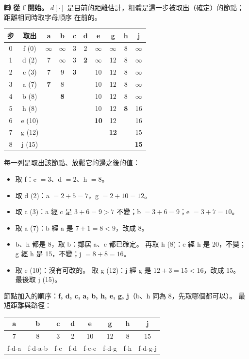 \begin{pastsoln}
\textbf{㈣ 從 f 開始。} $d[\cdot]$ 是目前的距離估計，粗體是這一步被取出（確定）的節點；距離相同時取字母順序
在前的。
\begin{center}
\small
\begin{tabular}{cc*{8}{c}}
\toprule
步 & 取出 & a & b & c & d & e & g & h & j \\
\midrule
0 & f (0) & $\infty$ & $\infty$ & 3 & 2 & $\infty$ & $\infty$ & 8 & $\infty$ \\
1 & d (2) & 7 & $\infty$ & 3 & \textbf{2} & $\infty$ & 12 & 8 & $\infty$ \\
2 & c (3) & 7 & 9 & \textbf{3} & & 10 & 12 & 8 & $\infty$ \\
3 & a (7) & \textbf{7} & 8 & & & 10 & 12 & 8 & $\infty$ \\
4 & b (8) & & \textbf{8} & & & 10 & 12 & 8 & $\infty$ \\
5 & h (8) & & & & & 10 & 12 & \textbf{8} & 16 \\
6 & e (10) & & & & & \textbf{10} & 12 & & 16 \\
7 & g (12) & & & & & & \textbf{12} & & 15 \\
8 & j (15) & & & & & & & & \textbf{15} \\
\bottomrule
\end{tabular}
\end{center}
每一列是取出該節點、放鬆它的邊之後的值：
\begin{itemize}
\item 取 f：c $= 3$、d $= 2$、h $= 8$。
\item 取 d (2)：a $= 2+5 = 7$，g $= 2+10 = 12$。
\item 取 c (3)：a 經 c 是 $3+6 = 9 > 7$ 不變；b $= 3+6 = 9$；e $= 3+7 = 10$。
\item 取 a (7)：b 經 a 是 $7+1 = 8 < 9$，改成 8。
\item b、h 都是 8，取 b：鄰居 a、c 都已確定。 再取 h (8)：e 經 h 是 20，不變；g 經 h 是 15，不變；j $= 8+8 = 16$。
\item 取 e (10)：沒有可改的。 取 g (12)：j 經 g 是 $12+3 = 15 < 16$，改成 15。 最後取 j (15)。
\end{itemize}
節點加入的順序：\textbf{f, d, c, a, b, h, e, g, j}（b、h 同為 8，先取哪個都可以）。 最短距離與路徑：
\begin{center}
\begin{tabular}{cccccccc}
\toprule
a & b & c & d & e & g & h & j \\
\midrule
7 & 8 & 3 & 2 & 10 & 12 & 8 & 15 \\
f-d-a & f-d-a-b & f-c & f-d & f-c-e & f-d-g & f-h & f-d-g-j \\
\bottomrule
\end{tabular}
\end{center}
\end{pastsoln}
